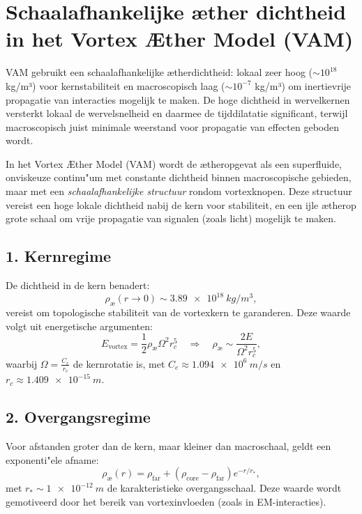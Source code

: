 
\section*{Schaalafhankelijke æther dichtheid in het Vortex Æther Model (VAM)}


VAM gebruikt een schaalafhankelijke ætherdichtheid: lokaal zeer hoog ($\sim10^{18}$ kg/m³) voor kernstabiliteit en macroscopisch laag ($\sim10^{-7}$ kg/m³) om inertievrije propagatie van interacties mogelijk te maken. De hoge dichtheid in wervelkernen versterkt lokaal de wervelsnelheid en daarmee de tijddilatatie significant, terwijl macroscopisch juist minimale weerstand voor propagatie van effecten geboden wordt.


In het Vortex Æther Model (VAM) wordt de ætheropgevat als een superfluide, onviskeuze continu"um met constante dichtheid binnen macroscopische gebieden, maar met een \emph{schaalafhankelijke structuur} rondom vortexknopen. Deze structuur vereist een hoge lokale dichtheid nabij de kern voor stabiliteit, en een ijle ætherop grote schaal om vrije propagatie van signalen (zoals licht) mogelijk te maken.

\subsection*{1. Kernregime}

De dichtheid in de kern benadert:
\begin{equation}
    \rho_\text{\ae}(r \to 0) \sim \SI{3.89e18}{kg/m^3},
\end{equation}
vereist om topologische stabiliteit van de vortexkern te garanderen. Deze waarde volgt uit energetische argumenten:
\begin{equation}
    E_{\text{vortex}} = \frac{1}{2} \rho_\text{\ae} \Omega^2 r_c^5 \quad\Rightarrow\quad \rho_\text{\ae} \sim \frac{2 E}{\Omega^2 r_c^5},
\end{equation}
waarbij \( \Omega = \frac{C_e}{r_c} \) de kernrotatie is, met \( C_e \approx \SI{1.094e6}{m/s} \) en \( r_c \approx \SI{1.409e-15}{m} \).

\subsection*{2. Overgangsregime}

Voor afstanden groter dan de kern, maar kleiner dan macroschaal, geldt een exponenti"ele afname:
\begin{equation}
    \rho_\text{\ae}(r) = \rho_\text{far} + (\rho_\text{core} - \rho_\text{far}) e^{-r/r_*},
\end{equation}
met \( r_* \sim \SI{1e-12}{m} \) de karakteristieke overgangsschaal. Deze waarde wordt gemotiveerd door het bereik van vortexinvloeden (zoals in EM-interacties).

